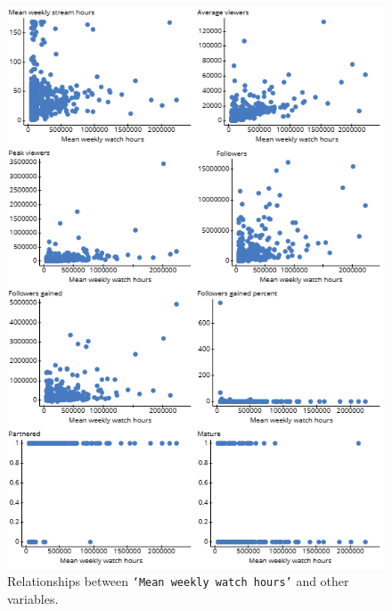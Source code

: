 \documentclass[12pt]{article}
\begin{document}
\begin{figure}
  \centering
  \includegraphics[width=0.8\linewidth]{../StatCrunch_Results/watch_scatter_plot_matrix.png}
  \captionsetup{justification=centering, singlelinecheck=false, margin=2cm}
  \caption[Watch Hours Scatter Plot Matrix]{Relationships between \texttt{`Mean weekly watch hours'} and other variables.}
  \label{fig:watch_scatter_matrix}
\end{figure}
\end{document}

